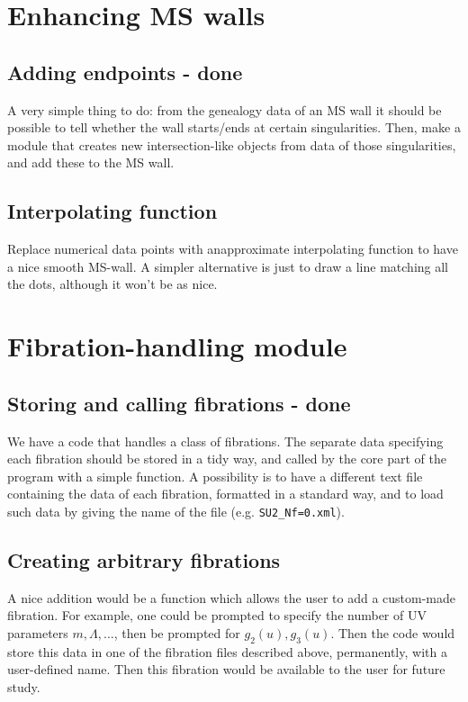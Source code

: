 \documentclass[11pt]{report}
\begin{document}
\section{Enhancing MS walls}\label{sec:bp-to-int}
\subsection{Adding endpoints  - {\color{red} \bf done}}
A very simple thing to do: from the genealogy data of an MS wall it should be possible to tell whether the wall starts/ends at certain singularities. Then, make a module that creates new intersection-like objects from data of those singularities, and add these to the MS wall. 

\subsection{Interpolating function}
Replace numerical data points with anapproximate interpolating function to have a nice smooth MS-wall. A simpler alternative is just to draw a line matching all the dots, although it won't be as nice.




\section{Fibration-handling module}
\subsection{Storing and calling fibrations - {\color{red} \bf done}}
We have a code that handles a class of fibrations. The separate data specifying each fibration should be stored in a tidy way, and called by the core part of the program with a simple function.
A possibility is to have a different text file containing the data of each fibration, formatted in a standard way, and to load such data by giving the name of the file (e.g. {\tt SU2\_Nf=0.xml}).

\subsection{Creating arbitrary fibrations}
A nice addition would be a function which allows the user to add a custom-made fibration. For example, one could be prompted to specify the number of UV parameters $m,\Lambda,\dots$, then be prompted for $g_{2}(u), g_{3}(u)$. Then the code would store this data in one of the fibration files described above, permanently, with a user-defined name. Then this fibration would be available to the user for future study.
\end{document}
